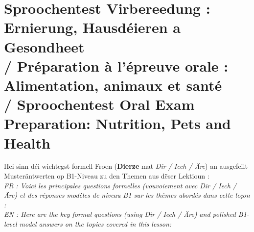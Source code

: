 \vspace{1.5em}

\section[Sproochentest Virbereedung: Ernierung \& Gesondheet]{Sproochentest Virbereedung : Ernierung, Hausdéieren a Gesondheet \\/ Préparation à l'épreuve orale : Alimentation, animaux et santé \\/ Sproochentest Oral Exam Preparation: Nutrition, Pets and Health}

Hei sinn déi wichtegst formell Froen (\textbf{Dierze} mat \textit{Dir / Iech / Äre}) an ausgefeilt Musteräntwerten op B1-Niveau zu den Themen aus dëser Lektioun : \\
\textit{FR : Voici les principales questions formelles (vouvoiement avec \textit{Dir / Iech / Äre}) et des réponses modèles de niveau B1 sur les thèmes abordés dans cette leçon :} \\
\textit{EN : Here are the key formal questions (using \textit{Dir / Iech / Äre}) and polished B1-level model answers on the topics covered in this lesson:}


